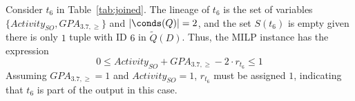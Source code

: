 \begin{example}
\label{ex:tuple-in-ranking}
Consider $t_6$ in Table~\ref{tab:joined}.
The lineage of $t_6$ is the set of variables $\{Activity_{SO}, GPA_{3.7, \geq}\}$ and $|\conds(Q)| = 2$, and the set $S(t_6)$ is empty given there is only $1$ tuple with ID $6$ in $\widetilde{Q}(D)$. Thus, the MILP instance has the expression 
$$0 \leq Activity_{SO} + GPA_{3.7, \geq} - 2 \cdot r_{t_6} \leq 1$$
Assuming $GPA_{3.7, \geq} = 1$ and $Activity_{SO} =1$, $r_{t_6}$ must be assigned $1$, indicating that $t_6$ is part of the output in this case. 



\end{example}

